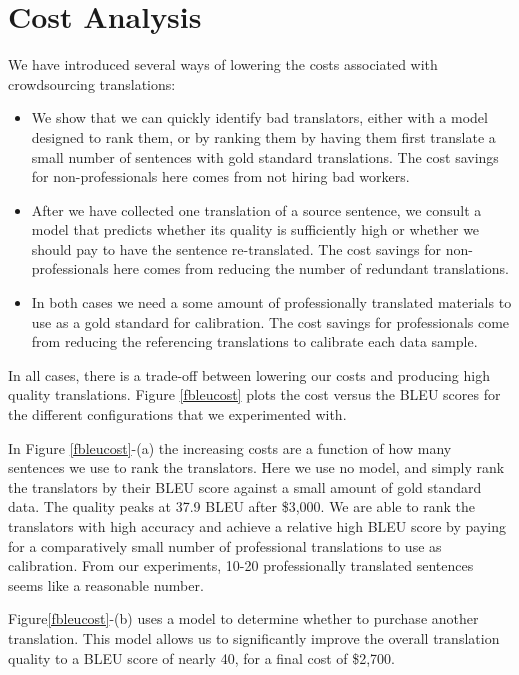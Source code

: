 \documentclass[11pt,letterpaper]{article}
\begin{document}
\section{Cost Analysis}
 We have introduced several ways of lowering the costs associated with crowdsourcing translations:
\begin{itemize}
\item We show that we can quickly identify bad translators, either with a model designed to rank them, or by ranking them by having them first translate a small number of sentences with gold standard translations. The cost savings for non-professionals here comes from not hiring bad workers.
\item After we have collected one translation of a source sentence, we consult a model that predicts whether its quality is sufficiently high or whether we should pay to have the sentence re-translated.  The cost savings for non-professionals here comes from reducing the number of redundant translations.
\item In both cases we need a some amount of professionally translated materials  to use as a gold standard for calibration. The cost savings for professionals come from reducing the referencing translations to calibrate each data sample. 
\end{itemize}
In all cases, there is a trade-off between lowering our costs and producing high quality translations.  Figure \ref{fbleucost} plots the cost versus the BLEU scores for the different configurations that we experimented with.

In Figure \ref{fbleucost}-(a) the increasing costs are a function of how many sentences we use to rank the translators.  Here we use no model, and simply rank the translators by their BLEU score against a small amount of gold standard data. The quality peaks at 37.9 BLEU after \$3,000.
We are able to rank the translators with high accuracy and achieve a relative high BLEU score by paying for a comparatively small number of professional translations to use as calibration. From our experiments,  10-20 professionally translated sentences seems like a reasonable number. 

Figure\ref{fbleucost}-(b) uses a model to determine whether to purchase another translation.  
This model allows us to significantly improve the overall translation quality to a BLEU score of nearly 40, for a final cost of \$2,700.
\end{document}
